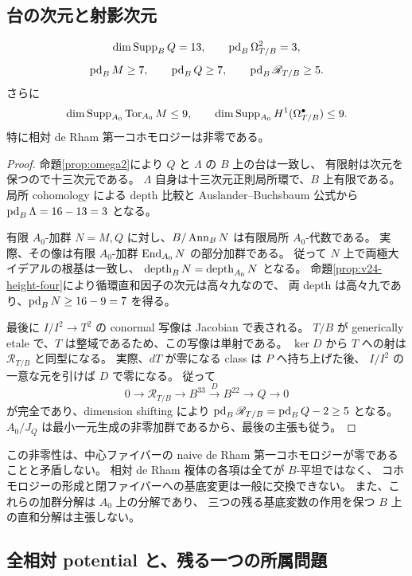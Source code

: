 

\subsection{台の次元と射影次元}

\begin{corollary}\label{cor:projective-dimensions}
\[
 \dim\operatorname{Supp}_BQ=13,\qquad \operatorname{pd}_B\Omega^2_{T/B}=3,
\]
\[
 \operatorname{pd}_BM\ge7,\qquad\operatorname{pd}_BQ\ge7,
 \qquad\operatorname{pd}_B\mathscr R_{T/B}\ge5.
\]
さらに
\[
 \dim\operatorname{Supp}_{A_0}\operatorname{Tor}_{A_0}M\le9,\qquad
 \dim\operatorname{Supp}_{A_0}H^1(\Omega^\bullet_{T/B})\le9.
\]
特に相対 de Rham 第一コホモロジーは非零である。
\end{corollary}

\begin{proof}
命題\ref{prop:omega2}により $Q$ と $\Lambda$ の $B$ 上の台は一致し、
有限射は次元を保つので十三次元である。
$\Lambda$ 自身は十三次元正則局所環で、$B$ 上有限である。
局所 cohomology による depth 比較と Auslander--Buchsbaum 公式から
$\operatorname{pd}_B\Lambda=16-13=3$ となる。

有限 $A_0$-加群 $N=M,Q$ に対し、$B/\operatorname{Ann}_BN$ は有限局所 $A_0$-代数である。
実際、その像は有限 $A_0$-加群 $\operatorname{End}_{A_0}N$ の部分加群である。
従って $N$ 上で両極大イデアルの根基は一致し、
$\operatorname{depth}_BN=\operatorname{depth}_{A_0}N$ となる。
命題\ref{prop:v24-height-four}により循環直和因子の次元は高々九なので、
両 depth は高々九であり、$\operatorname{pd}_BN\ge16-9=7$ を得る。

最後に $I/I^2\to T^2$ の conormal 写像は Jacobian で表される。
$T/B$ が generically etale で、$T$ は整域であるため、この写像は単射である。
$\ker D$ から $T$ への射は $\mathscr R_{T/B}$ と同型になる。
実際、$dT$ が零になる class は $P$ へ持ち上げた後、
$I/I^2$ の一意な元を引けば $D$ で零になる。
従って
\[
 0\longrightarrow\mathscr R_{T/B}\longrightarrow B^{33}
  \xrightarrow{D}B^{22}\longrightarrow Q\longrightarrow0
\]
が完全であり、dimension shifting により
$\operatorname{pd}_B\mathscr R_{T/B}=\operatorname{pd}_BQ-2\ge5$ となる。
$A_0/J_Q$ は最小一元生成の非零加群であるから、最後の主張も従う。
\end{proof}

この非零性は、中心ファイバーの naive de Rham 第一コホモロジーが零であることと矛盾しない。
相対 de Rham 複体の各項は全てが $B$-平坦ではなく、
コホモロジーの形成と閉ファイバーへの基底変更は一般に交換できない。
また、これらの加群分解は $A_0$ 上の分解であり、
三つの残る基底変数の作用を保つ $B$ 上の直和分解は主張しない。

\subsection{全相対 potential と、残る一つの所属問題}

